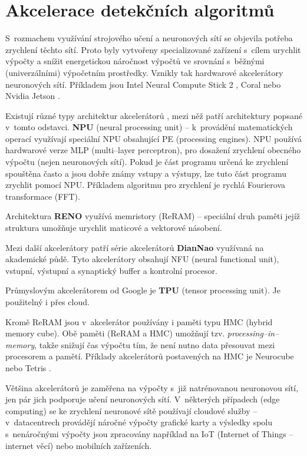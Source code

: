 \section{Akcelerace detekčních algoritmů}
\label{sekce:akcelerace}

S~rozmachem využívání strojového učení a neuronových sítí se objevila potřeba zrychlení těchto sítí. Proto byly vytvořeny specializované zařízení s~cílem urychlit výpočty a snížit energetickou náročnost výpočtů ve srovnání s~běžnými (univerzálními) výpočetním prostředky. Vznikly tak hardwarové akcelerátory neuronových sítí. Příkladem jsou Intel Neural Compute Stick 2 \cite{ncs2}, Coral \cite{coral} nebo Nvidia Jetson \cite{jetson}.

Existují různé typy architektur akcelerátorů \cite{acceleratorsSurvey}, mezi něž patří architektury popsané v~tomto odstavci.
\textbf{NPU} (neural processing unit) -- k~provádění matematických operací využívají speciální NPU obsahující PE (processing engines). NPU používá hardwarové verze MLP (multi--layer perceptron), pro dosažení zrychlení obecného výpočtu (nejen neuronových sítí). Pokud je část programu určená ke zrychlení spouštěna často a jsou dobře známy vstupy a výstupy, lze tuto část programu zrychlit pomocí NPU. Příkladem algoritmu pro zrychlení je rychlá Fourierova transformace (FFT).

Architektura \textbf{RENO} využívá memristory (ReRAM) -- speciální druh paměti jejíž struktura umožňuje urychlit maticové a vektorové násobení.

Mezi další akcelerátory patří série akcelerátorů \textbf{DianNao} využívaná na akademické půdě. Tyto akcelerátory obsahují NFU (neural functional unit), vstupní, výstupní a synaptický buffer a kontrolní procesor.

Průmyslovým akcelerátorem od Google je \textbf{TPU} (tensor processing unit). Je použitelný i přes cloud.

Kromě ReRAM jsou v~akcelerátor používány i paměti typu HMC (hybrid memory cube). Obě paměti (ReRAM a HMC) umožňují tzv. \emph{processing--in--memory}, takže snižují čas výpočtu tím, že není nutno data přesouvat mezi procesorem a pamětí. Příklady akcelerátorů postavených na HMC je Neurocube \cite{neurocube} nebo Tetris \cite{tetris}.

Většina akcelerátorů je zaměřena na výpočty s~již natrénovanou neuronovou sítí, jen pár jich podporuje učení neuronových sítí. V~některých případech (edge computing) se ke zrychlení neuronové sítě používají cloudové služby -- v~datacentrech provádějí náročné výpočty grafické karty a výsledky spolu s~nenáročnými výpočty jsou zpracovány například na IoT (Internet of Things -- internet věcí) nebo mobilních zařízeních.

